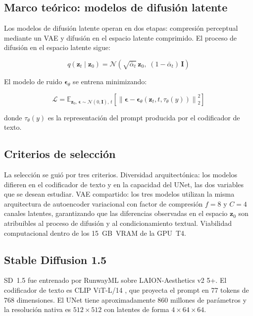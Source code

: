 \documentclass[12pt, a4paper, twoside]{book}
\newcommand{\z}{\mathbf{z}}
\newcommand{\eps}{\boldsymbol{\epsilon}}
\newcommand{\E}{\mathbb{E}}
\newcommand{\norm}[1]{\left\|#1\right\|_2}
\begin{document}
\subsection{Marco teórico: modelos de difusión latente}

Los modelos de difusión latente \citep{rombach2022ldm} operan en dos etapas: compresión perceptual mediante un VAE y difusión en el espacio latente comprimido. El proceso de difusión en el espacio latente sigue:

\begin{equation}
q(\z_t \mid \z_0) = \mathcal{N}\!\left(\sqrt{\bar{\alpha}_t}\,\z_0,\; (1 - \bar{\alpha}_t)\,\mathbf{I}\right)
\end{equation}

El modelo de ruido $\eps_\theta$ se entrena minimizando:

\begin{equation}
\mathcal{L} = \E_{\z_0,\, \eps \sim \mathcal{N}(0,\mathbf{I}),\, t}\!
\left[\norm{\eps - \eps_\theta(\z_t, t, \tau_\theta(y))}^2\right]
\end{equation}

donde $\tau_\theta(y)$ es la representación del prompt producida por el codificador de texto.

\subsection{Criterios de selección}

La selección se guió por tres criterios. Diversidad arquitectónica: los modelos difieren en el codificador de texto y en la capacidad del UNet, las dos variables que se desean estudiar. VAE compartido: los tres modelos utilizan la misma arquitectura de autoencoder variacional con factor de compresión $f = 8$ y $C = 4$ canales latentes, garantizando que las diferencias observadas en el espacio $\z_0$ son atribuibles al proceso de difusión y al condicionamiento textual. Viabilidad computacional dentro de los 15~GB~VRAM de la GPU~T4.

\subsection{Stable Diffusion 1.5}

SD~1.5 \citep{rombach2022ldm} fue entrenado por RunwayML sobre LAION-Aesthetics v2 5+. El codificador de texto es CLIP ViT-L/14 \citep{radford2021clip}, que proyecta el prompt en 77 tokens de 768 dimensiones. El UNet tiene aproximadamente 860 millones de parámetros y la resolución nativa es $512 \times 512$ con latentes de forma $4 \times 64 \times 64$.
\end{document}
